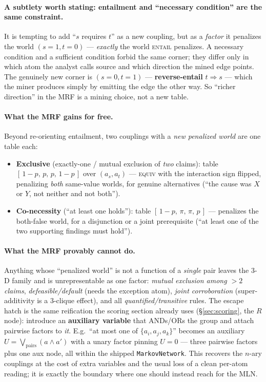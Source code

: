 \documentclass[11pt]{article}
\newcommand{\Ent}{\textsc{entail}}
\newcommand{\Equ}{\textsc{equiv}}
\begin{document}
\paragraph{A subtlety worth stating: entailment and ``necessary condition'' are the same
constraint.} It is tempting to add ``$s$ requires $t$'' as a new coupling, but as a
\emph{factor} it penalizes the world $(s{=}1,t{=}0)$ --- \emph{exactly} the world \Ent{}
penalizes. A necessary condition and a sufficient condition forbid the same corner; they
differ only in which atom the analyst calls source and which direction the mined edge points.
The genuinely new corner is $(s{=}0,t{=}1)$ --- \textbf{reverse-entail} $t\!\Rightarrow\!s$
--- which the miner produces simply by emitting the edge the other way. So ``richer
direction'' in the MRF is a mining choice, not a new table.

\paragraph{What the MRF gains for free.} Beyond re-orienting entailment, two couplings with a
\emph{new penalized world} are one table each:
\begin{itemize}[leftmargin=*,nosep]
  \item \textbf{Exclusive} (exactly-one / mutual exclusion of \emph{two} claims): table
        $[\,1{-}p,\,p,\,p,\,1{-}p\,]$ over $(a_s,a_t)$ --- \Equ{} with the interaction sign
        flipped, penalizing \emph{both} same-value worlds, for genuine alternatives (``the
        cause was $X$ or $Y$, not neither and not both'').
  \item \textbf{Co-necessity} (``at least one holds''): table $[\,1{-}p,\,\pi,\,\pi,\,p\,]$
        --- penalizes the both-false world, for a disjunction or a joint prerequisite (``at
        least one of the two supporting findings must hold'').
\end{itemize}

\paragraph{What the MRF provably cannot do.} Anything whose ``penalized world'' is not a
function of a \emph{single} pair leaves the 3-D family and is unrepresentable as one factor:
\emph{mutual exclusion among $>2$ claims}, \emph{defeasible/default} (needs the exception
atom), \emph{joint corroboration} (super-additivity is a 3-clique effect), and all
\emph{quantified/transitive} rules. The escape hatch is the same reification the scoring
section already uses (\S\ref{sec:scoring}, the $R$ node): introduce an \textbf{auxiliary
variable} that ANDs/ORs the group and attach pairwise factors to \emph{it}. E.g.\ ``at most
one of $\{a_i,a_j,a_k\}$'' becomes an auxiliary $U=\bigvee_{\text{pairs}}(a\wedge a')$ with a
unary factor pinning $U{=}0$ --- three pairwise factors plus one aux node, all within the
shipped \texttt{MarkovNetwork}. This recovers the $n$-ary couplings at the cost of extra
variables and the usual loss of a clean per-atom reading; it is exactly the boundary where
one should instead reach for the MLN.
\end{document}
